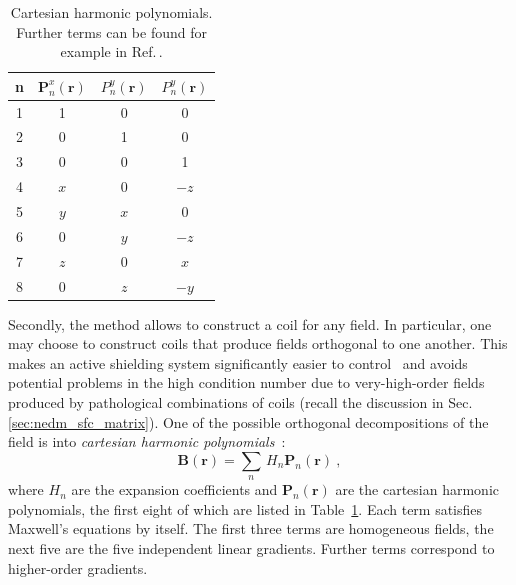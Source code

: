 \begin{table}
  \centering
  \begin{tabular}{c|ccc}
    n & $\mathbf{P}_n^x(\mathbf{r})$ & $P_n^y(\mathbf{r})$ & $P_n^y(\mathbf{r})$ \\ \midrule
    1 & 1 & 0 & 0 \\
    2 & 0 & 1 & 0 \\
    3 & 0 & 0 & 1 \\
    \midrule
    4 & $x$ &  0  & $-z$ \\
    5 & $y$ & $x$ &   0  \\
    6 &  0  & $y$ & $-z$ \\
    7 & $z$ &  0  & $ x$ \\
    8 &  0  & $z$ & $-y$ \\
  \end{tabular}
  \caption{Cartesian harmonic polynomials. Further terms can be found for example in Ref.\,\cite{Franke2013}.}\label{tab:coils_cartesian_harmonics}
\end{table}

Secondly, the method allows to construct a coil for any field.
In particular, one may choose to construct coils that produce fields orthogonal to one another. 
This makes an active shielding system significantly easier to control~\cite{MRM:MRM1910010107} and avoids potential problems in the high condition number due to very-high-order fields produced by pathological combinations of coils (recall the discussion in Sec.\,\ref{sec:nedm_sfc_matrix}).
One of the possible orthogonal decompositions of the field is into \emph{cartesian harmonic polynomials}~\cite{Franke2013}:
\begin{equation}
  \mathbf{B}(\mathbf{r}) = \sum_{n}\,H_n \mathbf{P}_n(\mathbf{r}) \ ,
\end{equation}
where $H_n$ are the expansion coefficients and $\mathbf{P}_n(\mathbf{r})$ are the cartesian harmonic polynomials, the first eight of which are listed in Table~\ref{tab:coils_cartesian_harmonics}.
Each term satisfies Maxwell's equations by itself.
The first three terms are homogeneous fields, the next five are the five independent linear gradients.
Further terms correspond to higher-order gradients.

